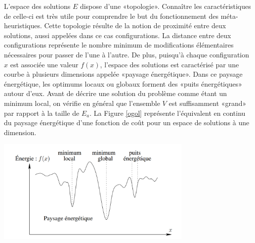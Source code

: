 L'espace des solutions $E$ dispose d'une «topologie». Connaître les caractéristiques de celle-ci est très utile pour comprendre le but du fonctionnement des méta-heuristiques. Cette topologie résulte de la notion de proximité entre deux solutions, aussi appelées dans ce cas configurations. La distance entre deux configurations représente le nombre minimum de modifications élémentaires nécessaires pour passer de l'une à l'autre. De plus, puisqu'à chaque configuration $x$ est associée une valeur $f(x)$, l'espace des solutions est caractérisé par une courbe à plusieurs dimensions appelée «paysage énergétique». Dans ce paysage énergétique, les optimums locaux ou globaux forment des «puits énergétiques» autour d'eux. Avant de décrire une solution du problème comme étant un minimum local, on vérifie en général que l'ensemble $V$ est suffisamment «grand» par rapport à la taille de $E_a$. La Figure \ref{ogol} représente l'équivalent en continu du paysage énergétique d'une fonction de coût pour un espace de solutions à une dimension.\\

\begin{center} 
	\includegraphics[height=2in]{img/Optimum_global_optimum_local.png}	
	 \label{ogol}
\end{center}